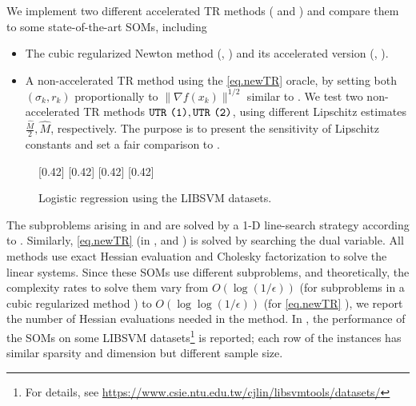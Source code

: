 \documentclass[moor,sglanonrev]{informs4}
\begin{document}
We implement two different accelerated TR methods (\atr{} and \atrms{}) and compare them to some state-of-the-art SOMs, including
\begin{itemize}[leftmargin=*]
    \item The cubic regularized Newton method (\arc{}, \citet{nesterov2006cubic}) and its accelerated version (\arca{}, \citet{nesterov2008accelerating}).
    \item A non-accelerated TR method using the \ref{eq.newTR} oracle, by setting both $(\sigma_k, r_k)$ proportionally to $\|\nabla f(x_k)\|^{1/2}$ similar to \cite{jiang2026beyond}.
          We test two non-accelerated TR methods $\texttt{UTR}{}~\texttt{(1)}, \texttt{UTR}{}~\texttt{(2)}$, using different Lipschitz estimates $\tfrac{\widehat M}{2}, \widehat M$, respectively. The purpose is to present the sensitivity of Lipschitz constants and set a fair comparison to \arc{}.
\end{itemize}
\begin{figure}[!t]
    \small
    \centering
    [0.42\columnwidth]{
        \resizebox{0.42\columnwidth}{!}{}
    }
    [0.42\columnwidth]{
        \resizebox{0.42\columnwidth}{!}{}
    }
    [0.42\columnwidth]{
        \resizebox{0.42\columnwidth}{!}{}
    }
    [0.42\columnwidth]{
        \resizebox{0.42\columnwidth}{!}{}
    }

    \caption{Logistic regression using the LIBSVM datasets.}\label{fig.logistic regression}
    \normalsize
\end{figure}

The subproblems arising in \arc{} and \arca{} are solved by a 1-D line-search strategy according to \cite{nesterov2018lectures}. Similarly, \ref{eq.newTR} (in \utr{}, \atr{} and \atrms{}) is solved by searching the dual variable. All methods use exact Hessian evaluation and Cholesky factorization to solve the linear systems.
Since these SOMs use different subproblems, and theoretically, the complexity rates to solve them vary from $O\left(\log\left(1/\epsilon\right)\right)$ (for subproblems in a cubic regularized method \cite{nesterov2006cubic}) to $O\left(\log\log\left(1/\epsilon\right)\right)$ (for \ref{eq.newTR} \cite{ye1991new,vavasis1990proving}),
we report the number of Hessian evaluations needed in the method. In , the performance of the SOMs on some LIBSVM datasets\footnote{For details, see \url{https://www.csie.ntu.edu.tw/cjlin/libsvmtools/datasets/}} is reported; {\color{red} each row of the instances has similar sparsity and dimension but different sample size.}
\end{document}
